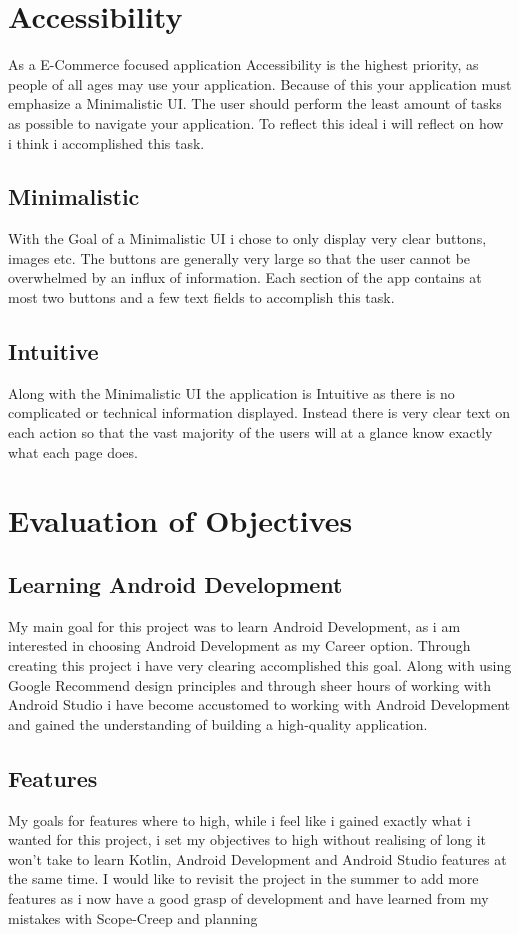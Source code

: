 \section{Accessibility}
As a E-Commerce focused application Accessibility is the highest priority, as people of all ages may use your application. Because of this your application must emphasize a Minimalistic UI. The user should perform the least amount of tasks as possible to navigate your application. To reflect this ideal i will reflect on how i think i accomplished this task.
\subsection{Minimalistic}
With the Goal of a Minimalistic UI i chose to only display very clear buttons, images etc. The buttons are generally very large so that the user cannot be overwhelmed by an influx of information. Each section of the app contains at most two buttons and a few text fields to accomplish this task.
\subsection{Intuitive}
Along with the Minimalistic UI the application is Intuitive as there is no complicated or technical information displayed. Instead there is very clear text on each action so that the vast majority of the users will at a glance know exactly what each page does.

\section{Evaluation of Objectives}
\subsection{Learning Android Development}
My main goal for this project was to learn Android Development, as i am interested in choosing Android Development as my Career option. Through creating this project i have very clearing accomplished this goal. Along with using Google Recommend design principles and through sheer hours of working with Android Studio i have become accustomed to working with Android Development and gained the understanding of building a high-quality application.

\subsection{Features}
My goals for features where to high, while i feel like i gained exactly what i wanted for this project, i set my objectives to high without realising of long it won't take to learn Kotlin, Android Development and Android Studio features at the same time. I would like to revisit the project in the summer to add more features as i now have a good grasp of development and have learned from my mistakes with Scope-Creep and planning

